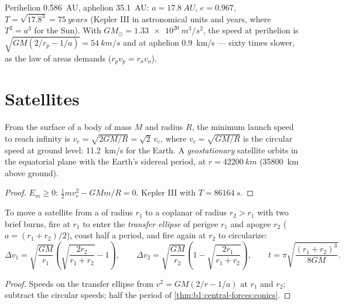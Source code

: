 \begin{example}\label{ex:b1:central-forces:halley}
Perihelion \qty{0.586}{AU}, aphelion \qty{35.1}{AU}: $a = \qty{17.8}{AU}$,
$e = 0.967$, $T = \sqrt{17.8^3} = \qty{75}{years}$ (Kepler III in
astronomical units and years, where $T^2 = a^3$ for the Sun). With
$GM_\odot = \qty{1.33e20}{m^3/s^2}$, the speed at perihelion is
$\sqrt{GM(2/r_p - 1/a)} = \qty{54}{km/s}$ and at aphelion \qty{0.9}{km/s}
--- sixty times slower, as the law of areas demands ($r_pv_p = r_av_a$).
\end{example}

\section{Satellites}

\begin{proposition}\label{prop:b1:central-forces:escape}
From the surface of a body of mass $M$ and radius $R$, the minimum
launch speed to reach infinity is $v_e = \sqrt{2GM/R} = \sqrt2\,v_c$,
where $v_c = \sqrt{GM/R}$ is the circular speed at ground level:
\qty{11.2}{km/s} for the Earth. A \emph{geostationary} satellite orbits
in the equatorial plane with the Earth's sidereal period, at
$r = \qty{42200}{km}$ (\qty{35800}{km} above ground).
\end{proposition}

\begin{proof}
$E_m \geq 0$: $\tfrac12 mv_e^2 - GMm/R = 0$. Kepler III with $T = \qty{86164}{s}$.
\end{proof}

\begin{proposition}\label{prop:b1:central-forces:hohmann}
To move a satellite from a  of radius $r_1$ to a coplanar
 of radius $r_2 > r_1$ with two brief burns, fire at $r_1$
to enter the \emph{transfer ellipse} of perigee $r_1$ and apogee $r_2$
($a = (r_1 + r_2)/2$), coast half a period, and fire again at $r_2$ to
circularize:
\[
\Delta v_1 = \sqrt{\frac{GM}{r_1}}\left(\sqrt{\frac{2r_2}{r_1 + r_2}} - 1\right),
\qquad
\Delta v_2 = \sqrt{\frac{GM}{r_2}}\left(1 - \sqrt{\frac{2r_1}{r_1 + r_2}}\right),
\qquad
t = \pi\sqrt{\frac{(r_1 + r_2)^3}{8GM}} .
\]
\end{proposition}

\begin{proof}
Speeds on the transfer ellipse from $v^2 = GM(2/r - 1/a)$ at $r_1$ and
$r_2$; subtract the circular speeds; half the period of
\cref{thm:b1:central-forces:conics}.
\end{proof}

